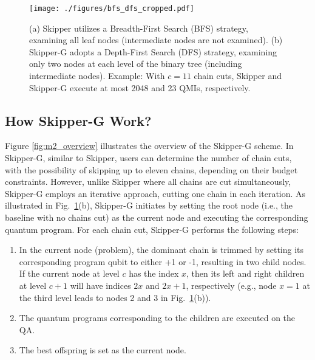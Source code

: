 \begin{figure}[b]
    \centering
    \texttt{[image: ./figures/bfs\_dfs\_cropped.pdf]}
    \caption{
        (a) Skipper utilizes a Breadth-First Search (BFS) strategy, examining all leaf nodes (intermediate nodes are not examined).
        (b) Skipper-G adopts a Depth-First Search (DFS) strategy, examining only two nodes at each level of the binary tree (including intermediate nodes).
        Example: With $c=11$ chain cuts, Skipper and Skipper-G execute at most 2048 and 23 QMIs, respectively.
}       
    \label{fig:BFS_DFS} 
\end{figure}  

\subsection{How Skipper-G Work?}

Figure \ref{fig:m2_overview} illustrates the overview of the Skipper-G scheme. 
In Skipper-G, similar to Skipper, users can determine the number of chain cuts, with the possibility of skipping up to eleven chains, depending on their budget constraints.
However, unlike Skipper where all chains are cut simultaneously, Skipper-G employs an iterative approach, cutting one chain in each iteration.
As illustrated in Fig.~\ref{fig:BFS_DFS}(b), Skipper-G initiates by setting the root node (i.e., the baseline with no chains cut) as the current node and executing the corresponding quantum program.
For each chain cut, Skipper-G performs the following steps:
\begin{enumerate}
    \item 
    In the current node (problem), the dominant chain is trimmed by setting its corresponding program qubit to either +1 or -1, resulting in two child nodes. 
    If the current node at level $c$ has the index $x$, then its left and right children at level $c+1$ will have indices $2x$ and $2x+1$, respectively (e.g., node $x=1$ at the third level leads to nodes 2 and 3 in Fig.~\ref{fig:BFS_DFS}(b)).
    
    \item 
    The quantum programs corresponding to the children are executed on the QA.
    
    \item 
    The best offspring is set as the current node.
\end{enumerate}


